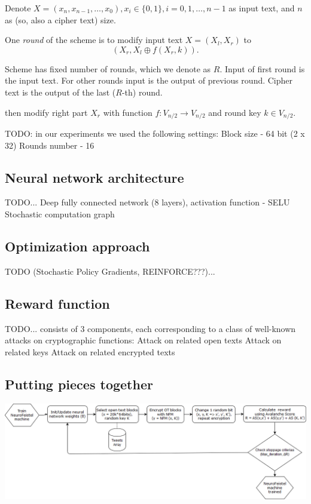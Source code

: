 \documentclass{article}
\begin{document}
Denote 
$X = (x_n, x_{n-1}, \dots, x_0), x_i \in \{0,1\}, i = 0, 1, \dots, n-1$ as
 input text, and 
$n$ as (so, also a cipher text) size.

One {\it round} of the scheme is to 
modify input text  $X = (X_l, X_r)$ 
to $$(X_r, X_l \oplus f(X_r, k)).$$

Scheme has fixed number of rounds, which 
we denote as $R$. 
Input of first round is the input text.
For other rounds input is the output of 
previous round. Cipher text is the output 
of the last ($R$-th) round.


then modify right part $X_r$ with 
function $f:V_{n/2}\rightarrow V_{n/2}$ and 
round key $k\in V_{n/2}$.

TODO: in our experiments we used the following settings:
Block size - 64 bit (2 x 32)
Rounds number - 16

\subsection{Neural network architecture}
TODO...
Deep fully connected network (8 layers), activation function - SELU
Stochastic computation graph

\subsection{Optimization approach}
TODO (Stochastic Policy Gradients, REINFORCE???)...

\subsection{Reward function}
TODO...
consists of 3 components, each corresponding to a class of well-known attacks on cryptographic functions:
Attack on related open texts
Attack on related keys
Attack on related encrypted texts

\subsection{Putting pieces together}
\includegraphics[scale=1]{img/NFM_learing.png}
\end{document}

